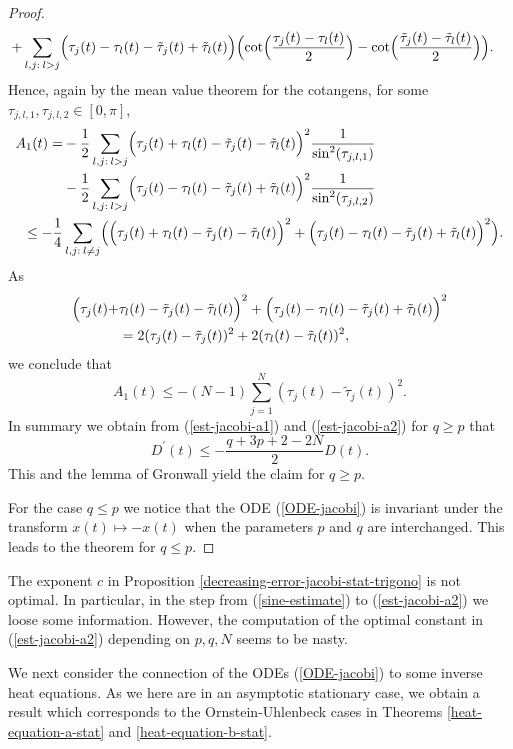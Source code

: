 \documentclass[reqno]{amsart}
\theoremstyle{plain}
\theoremstyle{definition}
\numberwithin{equation}{section}
\begin{document}
\begin{proof}
\begin{align}
+&
  \sum_{l,j: \> l> j}\Bigl( \tau_j(t)- \tau_l(t) -\tilde \tau_j(t)+\tilde \tau_l(t)\Bigr)
 \Bigl(\cot\Bigl(\frac{\tau_j(t)-\tau_l(t)}{2}\Bigr)-
\cot\Bigl(\frac{\tilde \tau_j(t)-\tilde \tau_l(t)}{2}\Bigr)\Bigr).\notag
\end{align}
Hence, again by the mean value theorem for the cotangens, for some $\tau_{j,l,1},\tau_{j,l,2}\in [0,\pi]$,
\begin{align}
  A_1(t)= & -\frac{1}{2} \sum_{l,j: \> l>j}\Bigl( \tau_j(t)+ \tau_l(t) -\tilde \tau_j(t)-\tilde \tau_l(t)\Bigr)^2\frac{1}{\sin^2( \tau_{j,l,1})}
\notag\\
&-\frac{1}{2} \sum_{l,j: \> l>j}\Bigl( \tau_j(t)- \tau_l(t) -\tilde \tau_j(t)+\tilde \tau_l(t)\Bigr)^2\frac{1}{\sin^2( \tau_{j,l,2})}\notag\\
\le  -\frac{1}{4} &\sum_{l,j: \> l\ne j}\Bigl(\Bigl( \tau_j(t)+ \tau_l(t) -\tilde \tau_j(t)-\tilde \tau_l(t)\Bigr)^2
+\Bigl( \tau_j(t)- \tau_l(t) -\tilde \tau_j(t)+\tilde \tau_l(t)\Bigr)^2\Bigr).\notag
\end{align}
As
\begin{align}
  \Bigl( \tau_j(t)+ &\tau_l(t) -\tilde \tau_j(t)-\tilde \tau_l(t)\Bigr)^2+
  \Bigl( \tau_j(t)-\tau_l(t) -\tilde \tau_j(t)+\tilde \tau_l(t)\Bigr)^2\notag\\
&= 2(\tau_j(t)-\tilde \tau_j(t))^2 +2(\tau_l(t)-\tilde \tau_l(t))^2,\end{align}
we conclude that
\begin{equation}\label{est-jacobi-a1}
  A_1(t)\le -(N-1)\sum_{j=1}^N (\tau_j(t)-\tilde \tau_j(t))^2.\end{equation}
In summary we obtain from (\ref{est-jacobi-a1}) and (\ref{est-jacobi-a2}) for $q\ge p$ that
$$D^\prime(t) \le   -\frac{q+3p+2-2N}{2} D(t).$$
This and the lemma of Gronwall yield the claim for $q\ge p$.

For the case $q\le p$ we notice that the ODE (\ref{ODE-jacobi}) is invariant under the transform $x(t)\mapsto -x(t)$
when the parameters $p$ and $q$ are interchanged. This leads to the theorem for $q\le p$.
 \end{proof}

 The exponent $c$ in Proposition \ref{decreasing-error-jacobi-stat-trigono} is not optimal. In particular, in the step from 
 (\ref{sine-estimate}) to (\ref{est-jacobi-a2}) we loose some information. However, the computation of the optimal constant in
(\ref{est-jacobi-a2}) depending on $p,q,N$ seems to be nasty.
 
  We next consider the connection of the ODEs (\ref{ODE-jacobi}) to some inverse heat equations. As we here are in an
 asymptotic stationary case, we obtain a result which corresponds to the Ornstein-Uhlenbeck cases in Theorems
 \ref{heat-equation-a-stat} and \ref{heat-equation-b-stat}.
\end{document}
